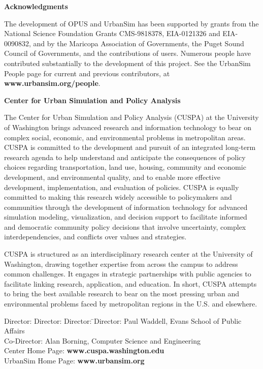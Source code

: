 
{\bf \large Acknowledgments}

The development of OPUS and UrbanSim has been supported by
grants from the National Science Foundation Grants CMS-9818378,
EIA-0121326 and EIA-0090832, and by the Maricopa Association
of Governments, the Puget Sound Council of Governments, and
the contributions of users. Numerous people have contributed 
substantially to the development of this project. See the
UrbanSim People page for current and previous contributors,
at {\bf www.urbansim.org/people}.   

{\bf \large Center for Urban Simulation and Policy Analysis}

The Center for Urban Simulation and Policy Analysis (CUSPA) at the
University of Washington brings advanced research and information
technology to bear on complex social, economic, and environmental
problems in metropolitan areas.  CUSPA is committed to the
development and pursuit of an integrated long-term research agenda
to help understand and anticipate the consequences of policy
choices regarding transportation, land use, housing, community and
economic development, and environmental quality, and to enable
more effective development, implementation, and evaluation of
policies. CUSPA is equally committed to making this research
widely accessible to policymakers and communities through the
development of information technology for advanced simulation
modeling, visualization, and decision support to facilitate
informed and democratic community policy decisions that involve
uncertainty, complex interdependencies, and conflicts over values
and strategies.

CUSPA is structured as an interdisciplinary research center at the
University of Washington, drawing together expertise from across
the campus to address common challenges.  It engages in strategic
partnerships with public agencies to facilitate linking research,
application, and education.  In short, CUSPA attempts to bring the
best available research to bear on the most pressing urban and
environmental problems faced by metropolitan regions in the U.S.
and elsewhere.

\begin{tabbing}
Director: Director: Director: \= \kill Director:\> Paul Waddell,
Evans School of Public Affairs \\
Co-Director:\> Alan Borning, Computer Science and Engineering \\

Center Home Page: \> {\bf www.cuspa.washington.edu} \\
UrbanSim Home Page: \> {\bf www.urbansim.org}
\end{tabbing}

